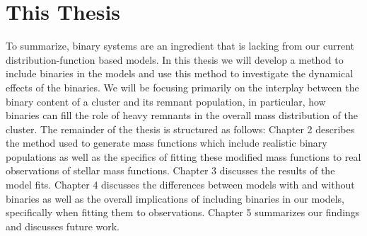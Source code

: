 \section{This Thesis}
To summarize, binary systems are an ingredient that is lacking from our current
distribution-function based models. In this thesis we will develop a method to include binaries in
the  models and use this method to investigate the dynamical effects of the binaries.
We will be focusing primarily on the interplay between the binary content of a cluster and its
remnant population, in particular, how binaries can fill the role of heavy remnants in the overall
mass distribution of the cluster. The remainder of the thesis is structured as follows: Chapter 2
describes the method used to generate mass functions which include realistic binary populations as
well as the specifics of fitting these modified mass functions to real observations of stellar mass
functions. Chapter 3 discusses the results of the model fits. Chapter 4 discusses the differences
between models with and without binaries as well as the overall implications of including binaries
in our models, specifically when fitting them to observations. Chapter 5 summarizes our findings and
discusses future work.




